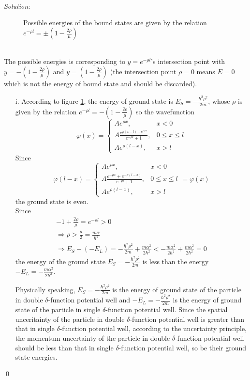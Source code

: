 \documentclass[12pt,a4paper]{article}
\newenvironment{sol}
    {\emph{Solution:}
    }
    {
    \qed
    }
\begin{document}
\begin{sol}
\begin{itemize}
\begin{figure}[h]
\caption{Possible energies of the bound states are given by the relation $e^{-\rho l}=\pm\left(1-\frac{2\rho}{\mu}\right)$}\label{problem_5}
\end{figure}
\\The possible energies is corresponding to $y=e^{-\rho l}$'s intersection point with $y=-(1-\frac{2\rho}{\mu})$ and $y=(1-\frac{2\rho}{\mu})$ (the intersection point $\rho=0$ means $E=0$ which is not the energy of bound state and should be discarded).
\begin{itemize}
\item[i.] According to figure \ref{problem_5}, the energy of ground state is $E_S=-\frac{\hbar^2\rho^2}{2m}$, whose $\rho$ is given by the relation $e^{-\rho l}=-(1-\frac{2\rho}{\mu})$ so the wavefunction
\begin{equation}
\varphi(x)=
\left\{\begin{array}{ll}
Ae^{\rho x},&x<0\\
A\frac{e^{\rho(x-l)+e^{-\rho x}}}{e^{-\rho l}+1},&0\leq x\leq l\\
Ae^{\rho(l-x)},&x>l
\end{array}\right.
\end{equation}
Since
\begin{equation}
\varphi(l-x)=
\left\{\begin{array}{ll}
Ae^{\rho x},&x<0\\
A\frac{e^{-\rho x}+e^{-\rho(l-x)}}{e^{-\rho l}+1},&0\leq x\leq l\\
Ae^{\rho(l-x)},&x>l
\end{array}\right.
=\varphi(x)
\end{equation}
the ground state is even.\\
Since
\begin{gather}
-1+\frac{2\rho}{\mu}=e^{-\rho l}>0\\
\Longrightarrow\rho>\frac{\mu}{2}=\frac{m\alpha}{\hbar^2}\\
\Longrightarrow E_S-(-E_L)=-\frac{\hbar^2\rho^2}{2m}+\frac{m\alpha^2}{2\hbar^2}<-\frac{m\alpha^2}{2\hbar^2}+\frac{m\alpha^2}{2\hbar^2}=0
\end{gather}
the energy of the ground state $E_S=-\frac{\hbar^2\rho^2}{2m}$ is less than the energy $-E_L=-\frac{m\alpha^2}{2\hbar^2}$.

Physically speaking, $E_S=-\frac{\hbar^2\rho^2}{2m}$ is the energy of ground state of the particle in double $\delta$-function potential well and $-E_L=-\frac{\hbar^2\rho^2}{2m}$ is the energy of ground state of the particle in single $\delta$-function potential well. Since the spatial unceritainty of the particle in double $\delta$-function potential well is greater than that in single $\delta$-function potential well, according to the uncertainty principle, the momentum uncertainty of the particle in double $\delta$-function potential well should be less than that in single $\delta$-function potential well, so be their ground state energies.


\end{itemize}
\end{itemize}
\end{sol}
\end{document}
